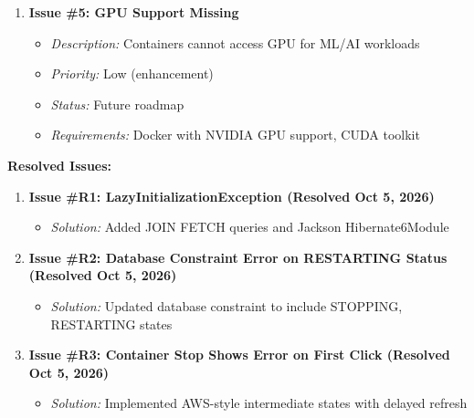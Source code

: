 \documentclass[12pt,a4paper]{article}
\begin{document}
\begin{enumerate}
    \item \textbf{Issue \#5: GPU Support Missing}
    \begin{itemize}[noitemsep]
        \item \textit{Description:} Containers cannot access GPU for ML/AI workloads
        \item \textit{Priority:} Low (enhancement)
        \item \textit{Status:} Future roadmap
        \item \textit{Requirements:} Docker with NVIDIA GPU support, CUDA toolkit
    \end{itemize}
\end{enumerate}

\textbf{Resolved Issues:}

\begin{enumerate}
    \item \textbf{Issue \#R1: LazyInitializationException (Resolved Oct 5, 2026)}
    \begin{itemize}[noitemsep]
        \item \textit{Solution:} Added JOIN FETCH queries and Jackson Hibernate6Module
    \end{itemize}
    
    \item \textbf{Issue \#R2: Database Constraint Error on RESTARTING Status (Resolved Oct 5, 2026)}
    \begin{itemize}[noitemsep]
        \item \textit{Solution:} Updated database constraint to include STOPPING, RESTARTING states
    \end{itemize}
    
    \item \textbf{Issue \#R3: Container Stop Shows Error on First Click (Resolved Oct 5, 2026)}
    \begin{itemize}[noitemsep]
        \item \textit{Solution:} Implemented AWS-style intermediate states with delayed refresh
    \end{itemize}
\end{enumerate}
\end{document}
